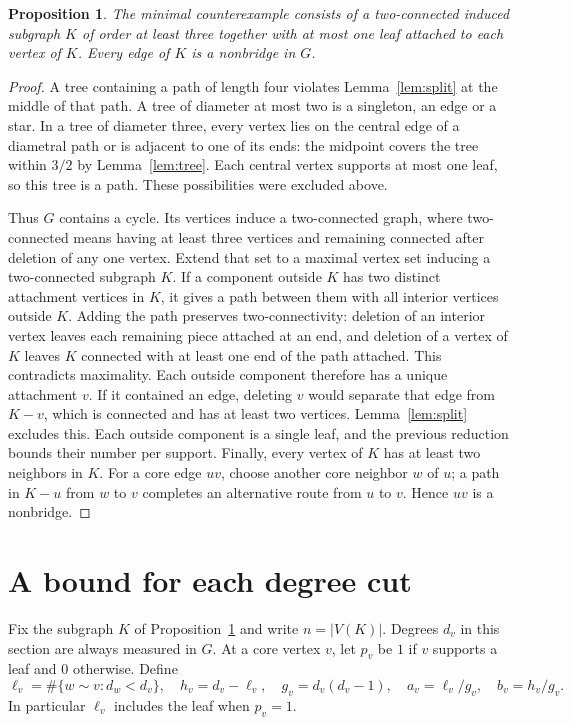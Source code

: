 \documentclass[11pt,a4paper]{article}
\newtheorem{proposition}[theorem]{Proposition}
\begin{document}
\begin{proposition}\label{prop:core}
The minimal counterexample consists of a two-connected induced subgraph
$K$ of order at least three together with at most one leaf attached to
each vertex of $K$. Every edge of $K$ is a nonbridge in $G$.
\end{proposition}
\begin{proof}
A tree containing a path of length four violates Lemma~\ref{lem:split}
at the middle of that path. A tree of diameter at most two is a
singleton, an edge or a star. In a tree of diameter three, every vertex
lies on the central edge of a diametral path or is adjacent to one of
its ends: the midpoint covers the tree within $3/2$ by
Lemma~\ref{lem:tree}. Each central vertex supports at most one leaf,
so this tree is a path. These possibilities were excluded above.

Thus $G$ contains a cycle. Its vertices induce a two-connected graph,
where two-connected means having at least three vertices and remaining
connected after deletion of any one vertex. Extend that set to a
maximal vertex set inducing a two-connected subgraph $K$. If a component
outside $K$ has two distinct attachment vertices in $K$, it gives a
path between them with all interior vertices outside $K$. Adding the
path preserves two-connectivity: deletion of an interior vertex leaves
each remaining piece attached at an end, and deletion of a vertex of
$K$ leaves $K$ connected with at least one end of the path attached.
This contradicts maximality. Each outside component therefore has a
unique attachment $v$. If it contained an edge, deleting $v$ would
separate that edge from $K-v$, which is connected and has at least
two vertices. Lemma~\ref{lem:split} excludes this. Each outside
component is a single leaf, and the previous reduction bounds their
number per support. Finally, every vertex of $K$ has at least two
neighbors in $K$. For a core edge $uv$, choose another core neighbor
$w$ of $u$; a path in $K-u$ from $w$ to $v$ completes an alternative
route from $u$ to $v$. Hence $uv$ is a nonbridge.
\end{proof}

\section{A bound for each degree cut}\label{sec:cuts}
Fix the subgraph $K$ of Proposition~\ref{prop:core} and write
$n=|V(K)|$. Degrees $d_v$ in this section are always measured in $G$.
At a core vertex $v$, let $p_v$ be $1$ if $v$ supports a leaf and
$0$ otherwise. Define
\[
 \ell_v=\#\{w\sim v:d_w<d_v\},\quad h_v=d_v-\ell_v,\quad
 g_v=d_v(d_v-1),\quad a_v=\ell_v/g_v,\quad b_v=h_v/g_v .
\]
In particular $\ell_v$ includes the leaf when $p_v=1$.
\end{document}

